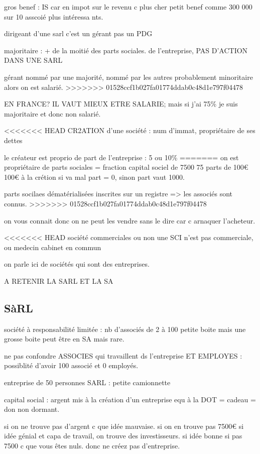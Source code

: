 \documentclass[a4paper,12pt]{article}
\begin{document}
gros benef : IS car en impot sur le revenu c plus cher
petit benef comme 300 000 sur 10 asscoié plus intéressa	nts.

dirigeant d'une sarl c'est un gérant pas un PDG

majoritaire : + de la moitié des parts sociales. de l'entreprise, PAS D'ACTION DANS UNE SARL

gérant nommé par une majorité, nommé par les autres probablement minoritaire alors
on est salarié.
>>>>>>> 01528ccf1b027fa01774ddab0c48d1e797f04478

EN FRANCE? IL VAUT MIEUX ETRE SALARIE;
mais si j'ai 75\% je suis majoritaire et donc non salarié.

<<<<<<< HEAD
CR2ATION d'une société : num d'immat, propriétaire de ses dettes 

le créateur est proprio de part de l'entreprise : 5 ou 10\%
=======
on est propriétaire de parts sociales = fraction capital sociel de 7500 75 parts de 100€
100€ à la crétion si va mal part = 0, sinon part vaut 1000.

parts socilaes dématérialisées inscrites sur un registre => les associés sont connus.
>>>>>>> 01528ccf1b027fa01774ddab0c48d1e797f04478

on vous connait donc on ne peut les vendre sans le dire car c arnaquer l'acheteur.

<<<<<<< HEAD
société commerciales ou non une SCI n'est pas commerciale, ou medecin cabinet en commun

on parle ici de sociétés qui sont des entreprises.


A RETENIR LA SARL ET LA SA

\subsection{SàRL}
société à responsabilité limitée : nb d'associés  de 2 à 100
petite boite mais une grosse boite peut être en SA mais rare.

ne pas confondre ASSOCIES qui travaillent ds l'entreprise ET  EMPLOYES :
possiblité d'avoir 100 associé et 0 employés.

entreprise de 50 personnes SARL : petite camionnette

capital social : argent mis à la création d'un entreprise equ à la DOT = cadeau = don
non dormant.

 
si on ne trouve pas d'argent c que idée mauvaise. si on en trouve pas 7500€
si idée génial et capa de travail, on trouve des investisseurs.
si idée bonne si pas 7500 c que vous êtes nuls.
donc ne créez pas d'entreprise.
\end{document}
